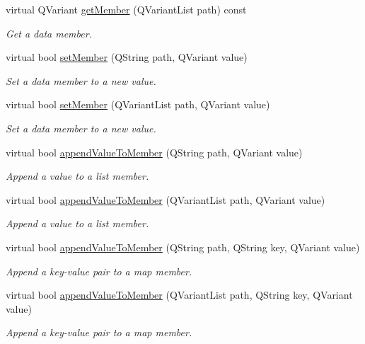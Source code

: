 \begin{DoxyCompactItemize}
virtual Q\-Variant \hyperlink{class_a_w_e_1_1_config_file_a4febc4a3faa00363d56ab81c7dbdd39e}{get\-Member} (Q\-Variant\-List path) const 
\begin{DoxyCompactList}\small\item\em Get a data member. \end{DoxyCompactList}\item 
virtual bool \hyperlink{class_a_w_e_1_1_config_file_a3b0af46143f4808bff222454fbd4f1cc}{set\-Member} (Q\-String path, Q\-Variant value)
\begin{DoxyCompactList}\small\item\em Set a data member to a new value. \end{DoxyCompactList}\item 
virtual bool \hyperlink{class_a_w_e_1_1_config_file_a612b4157dca090a24aee8b87d866c46f}{set\-Member} (Q\-Variant\-List path, Q\-Variant value)
\begin{DoxyCompactList}\small\item\em Set a data member to a new value. \end{DoxyCompactList}\item 
virtual bool \hyperlink{class_a_w_e_1_1_config_file_ab4b6767daec60be3c6c04a1b5cf9dd20}{append\-Value\-To\-Member} (Q\-String path, Q\-Variant value)
\begin{DoxyCompactList}\small\item\em Append a value to a list member. \end{DoxyCompactList}\item 
virtual bool \hyperlink{class_a_w_e_1_1_config_file_acae72a03af5a49e6ddf5a3144763100e}{append\-Value\-To\-Member} (Q\-Variant\-List path, Q\-Variant value)
\begin{DoxyCompactList}\small\item\em Append a value to a list member. \end{DoxyCompactList}\item 
virtual bool \hyperlink{class_a_w_e_1_1_config_file_af0f8c309d93cb9ed0073774d454e4fc1}{append\-Value\-To\-Member} (Q\-String path, Q\-String key, Q\-Variant value)
\begin{DoxyCompactList}\small\item\em Append a key-\/value pair to a map member. \end{DoxyCompactList}\item 
virtual bool \hyperlink{class_a_w_e_1_1_config_file_a94a8ddbacc4575e4778b005d8788b936}{append\-Value\-To\-Member} (Q\-Variant\-List path, Q\-String key, Q\-Variant value)
\begin{DoxyCompactList}\small\item\em Append a key-\/value pair to a map member. \end{DoxyCompactList}\end{DoxyCompactItemize}
